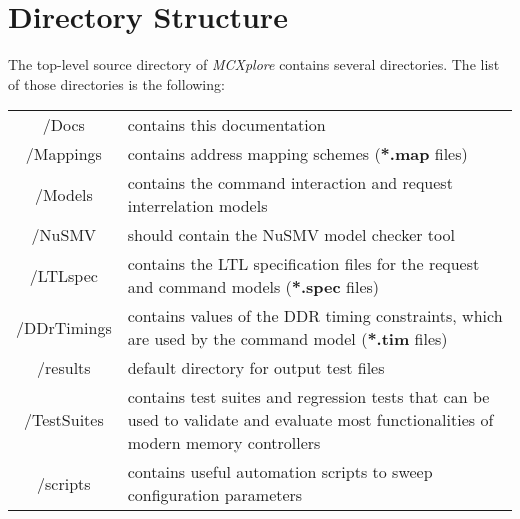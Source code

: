 \section{Directory Structure} 
The top-level source directory of \textit{MCXplore} contains several directories. The list of those directories is the following: 

\begin{tabular}{|c|p{13.5cm}|}
\hline
/Docs & contains this documentation\\
/Mappings & contains address mapping schemes (\textbf{*.map} files) \\

/Models & contains the command interaction and request interrelation models\\ 

/NuSMV & should contain the NuSMV model checker tool\\ 

/LTLspec & contains the LTL specification files for the request and command models (\textbf{*.spec} files)\\

/DDrTimings & contains values of the DDR timing constraints, which are used by the command model (\textbf{*.tim} files)\\
/results & default directory for output test files\\

/TestSuites & contains test suites and regression tests that can be used to validate and evaluate most functionalities of modern memory controllers\\

/scripts & contains useful automation scripts to sweep configuration parameters\\
\hline
\end{tabular}